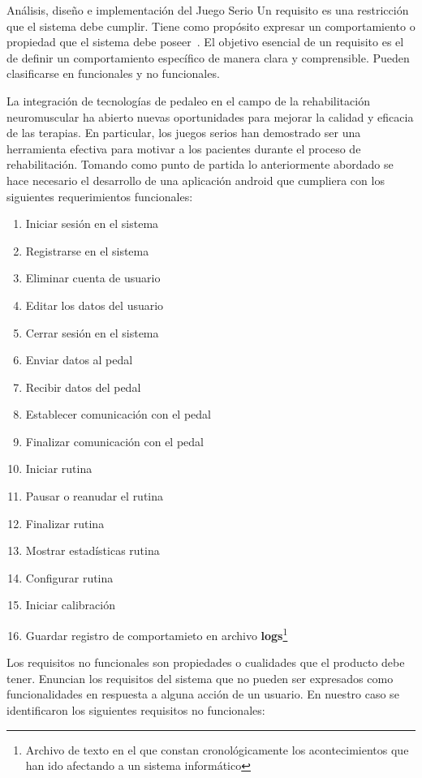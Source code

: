 \begin{thesischapter}{2} {Análisis, diseño e implementación del Juego Serio}
    Un requisito es una restricción que el sistema debe cumplir. Tiene como propósito expresar un comportamiento o propiedad que 
    el sistema debe poseer~\cite{jacobson2000uml}. El objetivo esencial de un requisito es el de definir un comportamiento específico 
    de manera clara y comprensible. Pueden clasificarse en funcionales 
    y no funcionales.

    La integración de tecnologías de pedaleo en el campo de la rehabilitación neuromuscular ha abierto nuevas oportunidades 
    para mejorar la calidad y eficacia de las terapias. En particular, los juegos serios han demostrado ser una herramienta 
    efectiva para motivar a los pacientes durante el proceso de rehabilitación. Tomando como punto de partida lo anteriormente 
    abordado se hace necesario el desarrollo de una aplicación android que cumpliera con los siguientes requerimientos funcionales:    

    \begin{enumerate}
        \item Iniciar sesión en el sistema
        \item Registrarse en el sistema
        \item Eliminar cuenta de usuario
        \item Editar los datos del usuario
        \item Cerrar sesión en el sistema
        \item Enviar datos al pedal
        \item Recibir datos del pedal
        \item Establecer comunicación con el pedal
        \item Finalizar comunicación con el pedal
        \item Iniciar rutina
        \item Pausar o reanudar el rutina
        \item Finalizar rutina
        \item Mostrar estadísticas rutina
        \item Configurar rutina
        \item Iniciar calibración
        \item Guardar registro de comportamieto en archivo \textbf{logs}\footnote{Archivo de texto en el que constan cronológicamente los acontecimientos que han ido afectando a un sistema informático}
    \end{enumerate}
    Los requisitos no funcionales son propiedades o cualidades que el producto debe tener. Enuncian los requisitos del sistema que no pueden ser expresados como funcionalidades en respuesta a alguna acción de un usuario. 
    En nuestro caso se identificaron los siguientes requisitos no funcionales:
        

\end{thesischapter}
